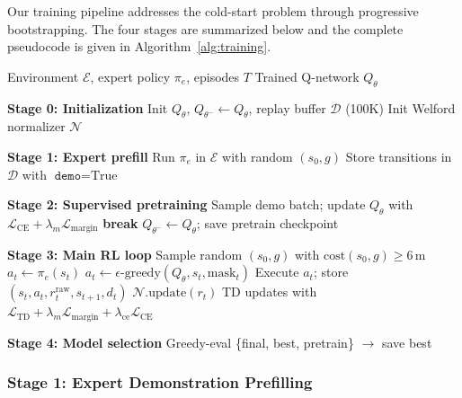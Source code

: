 \documentclass[conference]{IEEEtran}
\newcommand{\Qnet}{Q_\theta}
\newcommand{\Qtarget}{Q_{\theta^-}}
\begin{document}
Our training pipeline addresses the cold-start problem through progressive bootstrapping.
The four stages are summarized below and the complete pseudocode is given in Algorithm~\ref{alg:training}.

\begin{algorithm}[t]
\caption{Four-stage DQN training pipeline}
\label{alg:training}
\footnotesize
\begin{algorithmic}[1]
\Require Environment $\mathcal{E}$, expert policy $\pi_e$, episodes $T$
\Ensure Trained Q-network $\Qnet$

\Statex \textbf{Stage 0: Initialization}
\State Init $\Qnet$, $\Qtarget \leftarrow \Qnet$, replay buffer $\mathcal{D}$ (100K)
\State Init Welford normalizer $\mathcal{N}$

\Statex \textbf{Stage 1: Expert prefill}
    \State Run $\pi_e$ in $\mathcal{E}$ with random $(s_0, g)$
        \State Store transitions in $\mathcal{D}$ with $\texttt{demo}=\text{True}$
    \EndIf
\EndWhile

\Statex \textbf{Stage 2: Supervised pretraining}
    \State Sample demo batch; update $\Qnet$ with $\mathcal{L}_{\text{CE}} + \lambda_m \mathcal{L}_{\text{margin}}$
     \textbf{break} \EndIf
\EndFor
\State $\Qtarget \leftarrow \Qnet$; save pretrain checkpoint

\Statex \textbf{Stage 3: Main RL loop}
    \State Sample random $(s_0, g)$ with $\text{cost}(s_0, g) \geq 6$\,m
            \State $a_t \leftarrow \pi_e(s_t)$ 
        \Else
            \State $a_t \leftarrow \epsilon\text{-greedy}(\Qnet, s_t, \text{mask}_t)$
        \EndIf
        \State Execute $a_t$; store $(s_t, a_t, r_t^{\text{raw}}, s_{t+1}, d_t)$
        \State $\mathcal{N}.\text{update}(r_t)$
    \EndFor
    \State TD updates with $\mathcal{L}_{\text{TD}} + \lambda_m \mathcal{L}_{\text{margin}} + \lambda_{\text{ce}} \mathcal{L}_{\text{CE}}$
\EndFor

\Statex \textbf{Stage 4: Model selection}
\State Greedy-eval \{final, best, pretrain\} $\rightarrow$ save best
\end{algorithmic}
\end{algorithm}

\subsubsection{Stage 1: Expert Demonstration Prefilling}
\end{document}
